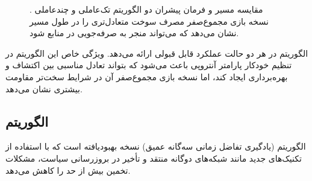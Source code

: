 \begin{figure}[H]
	\centering
	
	
	\caption{
		مقایسه مسیر و فرمان پیشران دو الگوریتم تک‌عاملی و چندعاملی .
		نسخه بازی مجموع‌صفر مصرف سوخت متعادل‌تری را در طول مسیر نشان می‌دهد که می‌تواند منجر به صرفه‌جویی در منابع شود.
	}
\end{figure}

الگوریتم  در هر دو حالت عملکرد قابل قبولی ارائه می‌دهد. ویژگی خاص این الگوریتم در تنظیم خودکار پارامتر آنتروپی باعث می‌شود که بتواند تعادل مناسبی بین اکتشاف و بهره‌برداری ایجاد کند، اما نسخه بازی مجموع‌صفر آن در شرایط سخت‌تر مقاومت بیشتری نشان می‌دهد.

\subsection{الگوریتم }

الگوریتم  (یادگیری تفاضل زمانی سه‌گانه عمیق) نسخه بهبودیافته  است که با استفاده از تکنیک‌های جدید مانند شبکه‌های دوگانه منتقد و تأخیر در بروزرسانی سیاست، مشکلات تخمین بیش از حد را کاهش می‌دهد.

